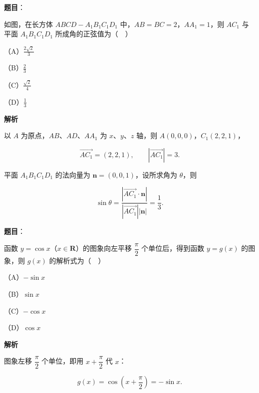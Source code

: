 \begin{answer}

\textbf{题目}：

如图，在长方体 $ABCD-A_1B_1C_1D_1$ 中，$AB=BC=2$，$AA_1=1$，则 $AC_1$ 与平面 $A_1B_1C_1D_1$ 所成角的正弦值为（　）

（A）$\frac{2\sqrt2}{3}$

（B）$\frac23$

（C）$\frac{\sqrt2}{4}$

（D）$\frac13$
\nopagebreak[4]
\begin{center}\end{center}
\nopagebreak[4]
\textbf{解析}

以 $A$ 为原点，$AB$、$AD$、$AA_1$ 为 $x$、$y$、$z$ 轴，则 $A(0,0,0)$，$C_1(2,2,1)$，

\nopagebreak[4]
\[\overrightarrow{AC_1}=(2,2,1),\qquad |\overrightarrow{AC_1}|=3.\]

平面 $A_1B_1C_1D_1$ 的法向量为 $\boldsymbol n=(0,0,1)$，设所求角为 $\theta$，则

\nopagebreak[4]
\[\sin\theta=\frac{|\overrightarrow{AC_1}\cdot\boldsymbol n|}{|\overrightarrow{AC_1}||\boldsymbol n|}=\frac13.\]


\end{answer}
\begin{answer}

\textbf{题目}：

函数 $y=\cos x$（$x\in\mathbf R$）的图象向左平移 $\dfrac{\pi}{2}$ 个单位后，得到函数 $y=g(x)$ 的图象，则 $g(x)$ 的解析式为（　）

（A）$-\sin x$

（B）$\sin x$

（C）$-\cos x$

（D）$\cos x$

\textbf{解析}

图象左移 $\dfrac{\pi}2$ 个单位，即用 $x+\dfrac{\pi}2$ 代 $x$：

\nopagebreak[4]
\[g(x)=\cos\left(x+\frac{\pi}2\right)=-\sin x.\]


\end{answer}
